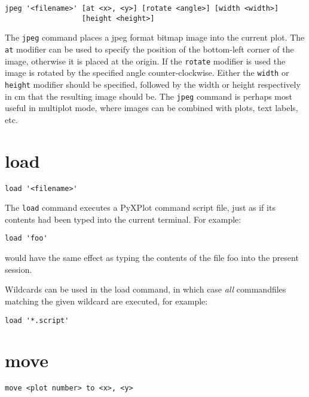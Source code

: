 \begin{verbatim}
jpeg '<filename>' [at <x>, <y>] [rotate <angle>] [width <width>]
                  [height <height>]
\end{verbatim}

The {\tt jpeg} command places a jpeg format bitmap image into the current plot.
The {\tt at} modifier can be used to specify the position of the bottom-left
corner of the image, otherwise it is placed at the origin.  If the {\tt rotate}
modifier is used the image is rotated by the specified angle counter-clockwise.
Either the {\tt width} or {\tt height} modifier should be specified, followed by
the width or height respectively in cm that the resulting image should be.  The
{\tt jpeg} command is perhaps most useful in multiplot mode, where images can be
combined with plots, text labels, etc.

\section{load}

\begin{verbatim}
load '<filename>'
\end{verbatim}

The {\tt load} command executes a PyXPlot command script file, just as if its
contents had been typed into the current terminal. For example:

\begin{verbatim}
load 'foo'
\end{verbatim}

\noindent would have the same effect as typing the contents of the file foo
into the present session.

Wildcards can be used in the load command, in which case \textit{all}
commandfiles matching the given wildcard are executed, for example:

\begin{verbatim}
load '*.script'
\end{verbatim}


\section{move}

\begin{verbatim}
move <plot number> to <x>, <y>
\end{verbatim}

